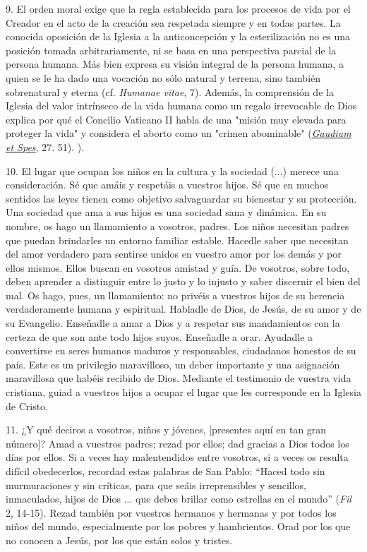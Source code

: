 9. El orden moral exige que la regla establecida para los procesos de
vida por el Creador en el acto de la creación sea respetada siempre y en
todas partes. La conocida oposición de la Iglesia a la anticoncepción y
la esterilización no es una posición tomada arbitrariamente, ni se basa
en una perspectiva parcial de la persona humana. Más bien expresa su
visión integral de la persona humana, a quien se le ha dado una vocación
no sólo natural y terrena, sino también sobrenatural y eterna (cf.
\emph{Humanae vitae}, 7). Además, la comprensión de la Iglesia del valor
intrínseco de la vida humana como un regalo irrevocable de Dios explica
por qué el Concilio Vaticano II habla de una "misión muy elevada para
proteger la vida" y considera el aborto como un "crimen abominable"
(\href{http://www.vatican.va/archive/hist_councils/ii_vatican_council/documents/vat-ii_const_19651207_gaudium-et-spes_it.html}{\emph{\emph{Gaudium
			et Spes}}}, 27. 51). ).

10. El lugar que ocupan los niños en la cultura y la sociedad (...)
merece una consideración. Sé que amáis y respetáis a vuestros hijos. Sé
que en muchos sentidos las leyes tienen como objetivo salvaguardar su
bienestar y su protección. Una sociedad que ama a sus hijos es una
sociedad sana y dinámica. En su nombre, os hago un llamamiento a
vosotros, padres. Los niños necesitan padres que puedan brindarles un
entorno familiar estable. Hacedle saber que necesitan del amor verdadero
para sentirse unidos en vuestro amor por los demás y por ellos mismos.
Ellos buscan en vosotros amistad y guía. De vosotros, sobre todo, deben
aprender a distinguir entre lo justo y lo injusto y saber discernir el
bien del mal. Os hago, pues, un llamamiento: no privéis a vuestros hijos
de su herencia verdaderamente humana y espiritual. Habladle de Dios, de
Jesús, de su amor y de su Evangelio. Enseñadle a amar a Dios y a
respetar sus mandamientos con la certeza de que son ante todo hijos
suyos. Enseñadle a orar. Ayudadle a convertirse en seres humanos maduros
y responsables, ciudadanos honestos de su país. Este es un privilegio
maravilloso, un deber importante y una asignación maravillosa que habéis
recibido de Dios. Mediante el testimonio de vuestra vida cristiana,
guiad a vuestros hijos a ocupar el lugar que les corresponde en la
Iglesia de Cristo.

11. ¿Y qué deciros a vosotros, niños y jóvenes, {[}presentes aquí en tan
gran número{]}? Amad a vuestros padres; rezad por ellos; dad gracias a
Dios todos los días por ellos. Si a veces hay malentendidos entre
vosotros, si a veces os resulta difícil obedecerlos, recordad estas
palabras de San Pablo: ``Haced todo sin murmuraciones y sin críticas,
para que seáis irreprensibles y sencillos, inmaculados, hijos de Dios
... que debes brillar como estrellas en el mundo'' (\emph{Fil} 2,
14-15). Rezad también por vuestros hermanos y hermanas y por todos los
niños del mundo, especialmente por los pobres y hambrientos. Orad por
los que no conocen a Jesús, por los que están solos y tristes.

